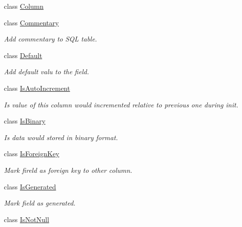 \begin{DoxyCompactItemize}
\item 
class \mbox{\hyperlink{class_uniform_data_operator_1_1_sql_1_1_tables_1_1_attributes_1_1_column}{Column}}
\item 
class \mbox{\hyperlink{class_uniform_data_operator_1_1_sql_1_1_tables_1_1_attributes_1_1_commentary}{Commentary}}
\begin{DoxyCompactList}\small\item\em Add commentary to S\+QL table. \end{DoxyCompactList}\item 
class \mbox{\hyperlink{class_uniform_data_operator_1_1_sql_1_1_tables_1_1_attributes_1_1_default}{Default}}
\begin{DoxyCompactList}\small\item\em Add default valu to the field. \end{DoxyCompactList}\item 
class \mbox{\hyperlink{class_uniform_data_operator_1_1_sql_1_1_tables_1_1_attributes_1_1_is_auto_increment}{Is\+Auto\+Increment}}
\begin{DoxyCompactList}\small\item\em Is value of this column would incremented relative to previous one during init. \end{DoxyCompactList}\item 
class \mbox{\hyperlink{class_uniform_data_operator_1_1_sql_1_1_tables_1_1_attributes_1_1_is_binary}{Is\+Binary}}
\begin{DoxyCompactList}\small\item\em Is data would stored in binary format. \end{DoxyCompactList}\item 
class \mbox{\hyperlink{class_uniform_data_operator_1_1_sql_1_1_tables_1_1_attributes_1_1_is_foreign_key}{Is\+Foreign\+Key}}
\begin{DoxyCompactList}\small\item\em Mark fireld as foreign key to other column. \end{DoxyCompactList}\item 
class \mbox{\hyperlink{class_uniform_data_operator_1_1_sql_1_1_tables_1_1_attributes_1_1_is_generated}{Is\+Generated}}
\begin{DoxyCompactList}\small\item\em Mark field as generated. \end{DoxyCompactList}\item 
class \mbox{\hyperlink{class_uniform_data_operator_1_1_sql_1_1_tables_1_1_attributes_1_1_is_not_null}{Is\+Not\+Null}}

\end{DoxyCompactItemize}

